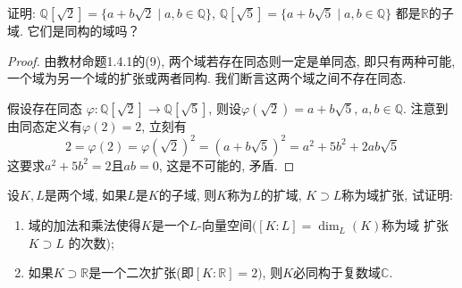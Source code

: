 \begin{problem}
    证明: $\mathbb{Q}[\sqrt 2] = \{a + b\sqrt 2 \mid a, b \in \mathbb{Q}\}$,
$\mathbb{Q}[\sqrt 5] = \{a + b\sqrt 5 \mid a, b \in \mathbb{Q}\}$
都是$\mathbb{R}$的子域. 它们是同构的域吗？
\end{problem}

\begin{proof}
    由教材命题1.4.1的(9), 两个域若存在同态则一定是单同态, 即只有两种可能, 
    一个域为另一个域的扩张或两者同构. 我们断言这两个域之间不存在同态.
    
    假设存在同态
$\varphi: \mathbb{Q}[\sqrt{2}] \to \mathbb{Q}[\sqrt{5}]$,
则设$\varphi(\sqrt{2}) = a + b\sqrt{5},\, a, b \in \mathbb{Q}$.
注意到由同态定义有$\varphi(2) = 2$, 立刻有
\[
    2 = \varphi(2) = \varphi(\sqrt{2})^2 = (a + b\sqrt{5})^2 = a^2 + 5b^2 + 2ab\sqrt{5}
\]
这要求$a^2 + 5b^2 = 2$且$ab = 0$, 这是不可能的, 矛盾.
\end{proof}

\begin{problem}\label{ex:1.4.9}
    设$K, L$是两个域, 如果$L$是$K$的子域, 则$K$称为$L$的扩域,
$K \supset L$称为域扩张, 试证明: 
\begin{enumerate}[(1)]
    \item 域的加法和乘法使得$K$是一个$L$-向量空间$([K:L] = \dim_L(K)$称为域
扩张$K \supset L$ 的次数);
    \item 如果$K \supset \mathbb{R}$是一个二次扩张(即$[K:\mathbb{R}] = 2)$,
则$K$必同构于复数域$\mathbb{C}$.
\end{enumerate}
\end{problem}

